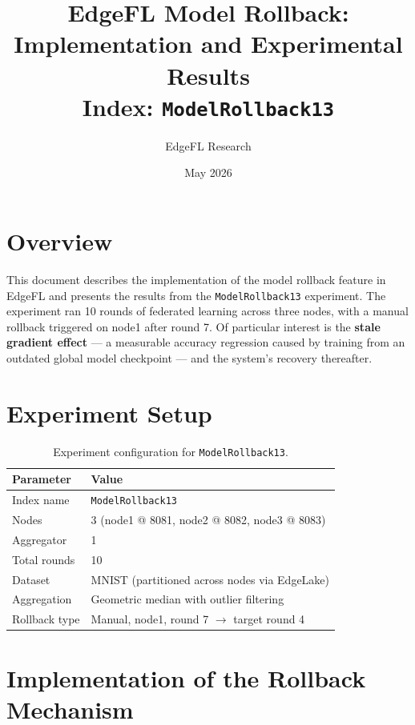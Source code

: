 \documentclass[11pt]{article}
\title{\textbf{EdgeFL Model Rollback: Implementation and Experimental Results}\\
\large Index: \texttt{ModelRollback13}}
\author{EdgeFL Research}
\date{May 2026}
\begin{document}
\maketitle
\tableofcontents
\newpage

\section{Overview}

This document describes the implementation of the model rollback feature in EdgeFL and presents the results from the \texttt{ModelRollback13} experiment. The experiment ran 10 rounds of federated learning across three nodes, with a manual rollback triggered on node1 after round 7. Of particular interest is the \textbf{stale gradient effect} — a measurable accuracy regression caused by training from an outdated global model checkpoint — and the system's recovery thereafter.

\section{Experiment Setup}

\begin{table}[H]
\centering
\begin{tabular}{ll}
\toprule
\textbf{Parameter} & \textbf{Value} \\
\midrule
Index name & \texttt{ModelRollback13} \\
Nodes & 3 (node1 @ 8081, node2 @ 8082, node3 @ 8083) \\
Aggregator & 1 \\
Total rounds & 10 \\
Dataset & MNIST (partitioned across nodes via EdgeLake) \\
Aggregation & Geometric median with outlier filtering \\
Rollback type & Manual, node1, round 7 $\rightarrow$ target round 4 \\
\bottomrule
\end{tabular}
\caption{Experiment configuration for \texttt{ModelRollback13}.}
\end{table}

\section{Implementation of the Rollback Mechanism}
\end{document}
